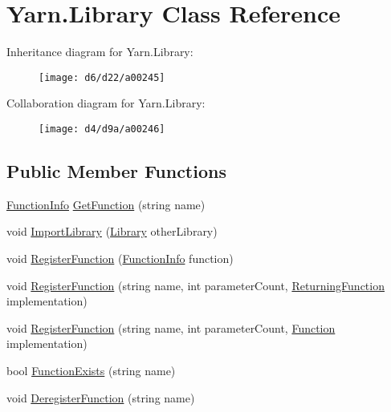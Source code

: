\hypertarget{a00049}{\section{Yarn.\-Library Class Reference}
\label{a00049}
}


Inheritance diagram for Yarn.\-Library\-:
\nopagebreak
\begin{figure}[H]
\begin{center}
\leavevmode
\texttt{[image: d6/d22/a00245]}
\end{center}
\end{figure}


Collaboration diagram for Yarn.\-Library\-:
\nopagebreak
\begin{figure}[H]
\begin{center}
\leavevmode
\texttt{[image: d4/d9a/a00246]}
\end{center}
\end{figure}
\subsection*{Public Member Functions}
\begin{DoxyCompactItemize}
\item 
\hyperlink{a00041}{Function\-Info} \hyperlink{a00049_aacfb1f00ad8aa3921941b8d8af0960e0}{Get\-Function} (string name)
\item 
void \hyperlink{a00049_ab42a4fd30a72156cafa685f959deef78}{Import\-Library} (\hyperlink{a00049}{Library} other\-Library)
\item 
void \hyperlink{a00049_a001ab29d21fe7db10fc9c250914287f9}{Register\-Function} (\hyperlink{a00041}{Function\-Info} function)
\item 
void \hyperlink{a00049_a2a698de0b528b2bac17bd85f57d45d4b}{Register\-Function} (string name, int parameter\-Count, \hyperlink{a00026_a5177bf74fbfe7303fac9d8236c2e514b}{Returning\-Function} implementation)
\item 
void \hyperlink{a00049_a6820eaa082077f16496effbc9041b7ad}{Register\-Function} (string name, int parameter\-Count, \hyperlink{a00026_ae0be2e5cf13d5779816102439e61ff1a}{Function} implementation)
\item 
bool \hyperlink{a00049_a6c9a1cc3e25b6aae25e210d8a0d68c09}{Function\-Exists} (string name)
\item 
void \hyperlink{a00049_a47d1b3664733207d5cda15f4a4a7af7a}{Deregister\-Function} (string name)
\end{DoxyCompactItemize}
